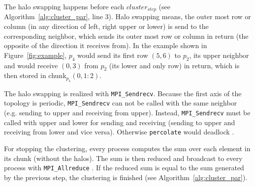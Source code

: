 \documentclass[twoside,11pt]{article}
\def\perc{\texttt{perco\-late}}
\begin{document}
The halo swapping happens before each $cluster_{step}$
(see Algorithm~\ref{alg:cluster_par}, line 3).
Halo swapping means, the outer most row or column (in
any direction of left, right upper or lower) is send
to the corresponding neighbor, which sends its outer most
row or column in return (the opposite of the direction it
receives from).
In the example shown in Figure~\ref{fig:example}, $p_4$
would send its first row $(5,6)$ to $p_2$, its upper
neighbor and would receive $(0,3)$ from $p_2$ (its lower
and only row) in return, which is then stored in
chunk$_{p_4}(0, 1:2)$.

The halo swapping is realized with \texttt{MPI\_Sendrecv}.
Because the first axis of the topology is periodic,
\texttt{MPI\_Sendrecv} can not be called with the same
neighbor (e.g. sending to upper and receiving from upper).
Instead, \texttt{MPI\_Sendrecv} must be called with
upper and lower for sending and receiving (sending to
upper and receiving from lower and vice versa).
Otherwise \perc{} would deadlock
\citep[see][Chapter 3]{mpi}.

For stopping the clustering, every process computes the
sum over each element in its chunk (without the halos).
The sum is then reduced and broadcast to every process
with \texttt{MPI\_Allreduce} \citep[see][Chapter 5]{mpi}.
If the reduced sum is equal to the sum generated by the
previous step, the clustering is finished (see
Algorithm~\ref{alg:cluster_par}).

\begin{algorithm} %
  \caption{: $c_{par}$}
  \label{alg:cluster_par}

  \begin{algorithmic}[1]
      \ENDIF
    \ENDWHILE
  \end{algorithmic}
\end{algorithm} %
\end{document}
